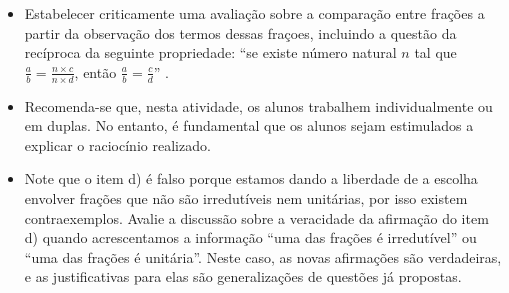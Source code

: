 \begin{atividade}\label{chap4-ativ23}
\objetivos
\begin{itemize} %
  \item     Estabelecer criticamente uma avaliação sobre a comparação entre
frações a partir da observação dos termos dessas fraçoes, incluindo a questão da
recíproca da seguinte propriedade:     ``se existe número natural $n$ tal que
$\frac{a}{b} = \frac{n \times c}{n \times d}$, então $\frac{a}{b} =
\frac{c}{d}$''    .
\end{itemize} %

\discussoes
\begin{itemize} %
  \item     Recomenda-se que, nesta atividade, os alunos trabalhem
individualmente ou em duplas. No entanto, é fundamental que os alunos sejam
estimulados a explicar o raciocínio realizado.
  \item     Note que o item d) é falso porque estamos dando a liberdade de a
escolha envolver frações que não são irredutíveis nem unitárias, por isso
existem contraexemplos. Avalie a discussão sobre a veracidade da afirmação do
item d) quando acrescentamos a informação ``uma das frações é irredutível'' ou
``uma das frações é unitária''. Neste caso, as novas afirmações são verdadeiras,
e as justificativas para elas são generalizações de questões já propostas.
\end{itemize} %


\end{atividade}
